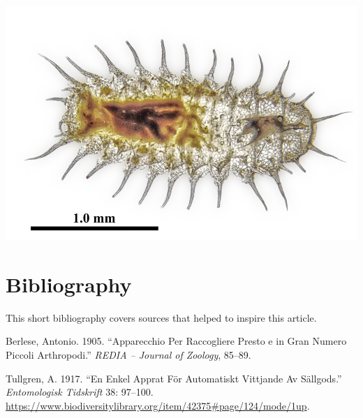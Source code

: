 \documentclass[
]{article}
\newlength{\cslhangindent}
\newlength{\cslentryspacingunit} %
\newenvironment{CSLReferences}[2] %
 {%
  \setlength{\parindent}{0pt}
  \ifodd #1
  \let\oldpar\par
  \def\par{\hangindent=\cslhangindent\oldpar}
  \fi
  \setlength{\parskip}{#2\cslentryspacingunit}
 }%
 {}
\begin{document}
\begin{center}\includegraphics[width=0.8\linewidth]{images/LRES-4} \end{center}

\newpage

\hypertarget{bibliography}{%
\section*{Bibliography}\label{bibliography}}

This short bibliography covers sources that helped to inspire this article.

\hypertarget{refs}{}
\begin{CSLReferences}{1}{0}
\leavevmode{}%
Berlese, Antonio. 1905. {``Apparecchio Per Raccogliere Presto e in Gran Numero Piccoli Arthropodi.''} \emph{REDIA -- Journal of Zoology}, 85--89.

\leavevmode{}%
Tullgren, A. 1917. {``En Enkel Apprat För Automatiskt Vittjande Av Sällgods.''} \emph{Entomologisk Tidskrift} 38: 97--100. \url{https://www.biodiversitylibrary.org/item/42375\#page/124/mode/1up}.

\end{CSLReferences}

\let\cleardoublepage\clearpage
\end{document}
